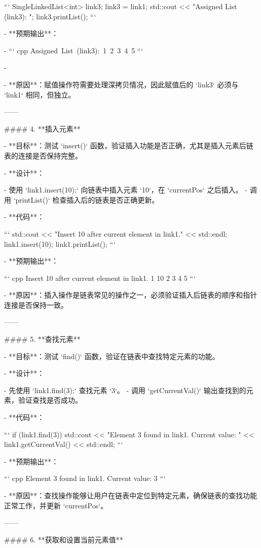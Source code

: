   ```
  SingleLinkedList<int> link3;
  link3 = link1;
  std::cout << "Assigned List (link3): ";
  link3.printList();
  ```

- **预期输出**：

- ``` cpp
  Assigned List (link3): 1 2 3 4 5
  ```

- 

- **原因**：赋值操作符需要处理深拷贝情况，因此赋值后的 `link3` 必须与 `link1` 相同，但独立。

------

#### 4. **插入元素**

- **目标**：测试 `insert()` 函数，验证插入功能是否正确，尤其是插入元素后链表的连接是否保持完整。

- **设计**：

  - 使用 `link1.insert(10);` 向链表中插入元素 `10`，在 `currentPos` 之后插入。
  - 调用 `printList()` 检查插入后的链表是否正确更新。

- **代码**：

  ```
  std::cout << "Insert 10 after current element in link1." << std::endl;
  link1.insert(10);
  link1.printList();
  ```

- **预期输出**：

  ``` cpp
  Insert 10 after current element in link1.
  1  10  2  3  4  5
  ```

  

- **原因**：插入操作是链表常见的操作之一，必须验证插入后链表的顺序和指针连接是否保持一致。

------

#### 5. **查找元素**

- **目标**：测试 `find()` 函数，验证在链表中查找特定元素的功能。

- **设计**：

  - 先使用 `link1.find(3);` 查找元素 `3`。
  - 调用 `getCurrentVal()` 输出查找到的元素，验证查找是否成功。

- **代码**：

  ```
  if (link1.find(3)) {
      std::cout << "Element 3 found in link1. Current value: " << link1.getCurrentVal() << std::endl;
  }
  ```

- **预期输出**：

  ``` cpp
  Element 3 found in link1. Current value: 3
  ```

  

- **原因**：查找操作能够让用户在链表中定位到特定元素，确保链表的查找功能正常工作，并更新 `currentPos`。

------

#### 6. **获取和设置当前元素值**

